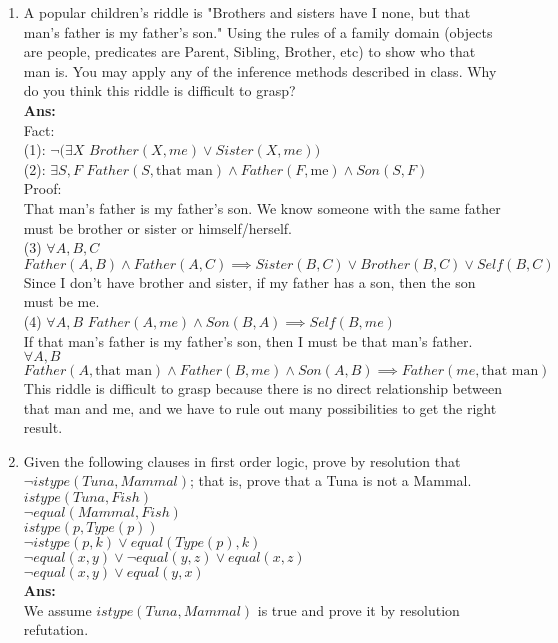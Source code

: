 \documentclass[12pt]{article}
\begin{document}
\begin{enumerate}
\item{A popular children's riddle is "Brothers and sisters have I none, but that man's father is my father's son." Using the rules of a family domain (objects are people, predicates are Parent, Sibling, Brother, etc) to show who that man is. You may apply any of the inference methods described in class. Why do you think this riddle is difficult to grasp?}\\
\textbf{Ans:}\\
Fact:\\
(1): \(\lnot (\exists X\) \(Brother(X, me) \lor Sister(X, me))\)\\
(2): \(\exists S, F\) \(Father(S, \text{that man}) \land Father(F, \text{me}) \land Son(S, F)\)\\
Proof:\\
That man's father is my father's son. We know someone with the same father must be brother or sister or himself/herself.\\
(3) \(\forall A, B, C\) \(Father(A, B) \land Father(A, C) \implies Sister(B, C) \lor Brother(B, C) \lor Self(B, C)\)\\
Since I don't have brother and sister, if my father has a son, then the son must be me.\\
(4) \(\forall A, B\) \(Father(A, me) \land Son(B, A) \implies Self(B, me)\)\\
If that man's father is my father's son, then I must be that man's father.\\
\(\forall A, B\) \(Father(A, \text{that man}) \land Father(B, me) \land Son(A, B) \implies Father(me, \text{that man})\)\\

This riddle is difficult to grasp because there is no direct relationship between that man and me, and we have to rule out many possibilities to get the right result.

\item{Given the following clauses in first order logic, prove by resolution that \(\lnot istype(Tuna,Mammal)\); that is, prove that a Tuna is not a Mammal. \\
\(istype(Tuna,Fish)\) \\
\(\lnot equal(Mammal,Fish)\) \\
\(istype(p,Type(p))\) \\
\(\lnot istype(p,k) \lor equal(Type(p),k)\) \\
\(\lnot equal(x,y) \lor \lnot equal(y,z) \lor equal(x,z)\) \\
\(\lnot equal(x,y) \lor equal(y,x)\)}\\
\textbf{Ans:}\\
We assume \(istype(Tuna,Mammal)\) is true and prove it by resolution refutation.\\


\end{enumerate}
\end{document}
